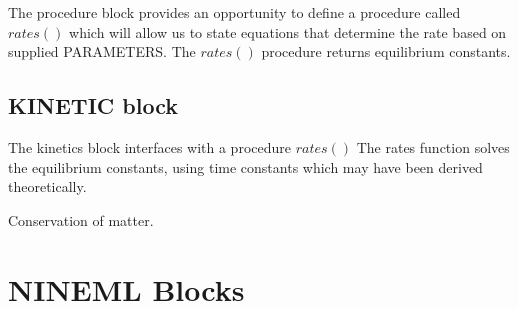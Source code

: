 \documentclass[draftspec]{ninemlspec}
\begin{document}
The procedure block provides an opportunity to define a procedure called $rates()$  which will allow us to state equations that determine the rate based on supplied PARAMETERS. The $rates()$ procedure returns equilibrium constants.

 
 



\subsection{KINETIC block}



The kinetics block interfaces with a procedure $rates()$
The rates function solves the equilibrium constants, using time constants which may have been derived theoretically.

Conservation of matter.
 

%
%



\section{NINEML Blocks}
\end{document}
